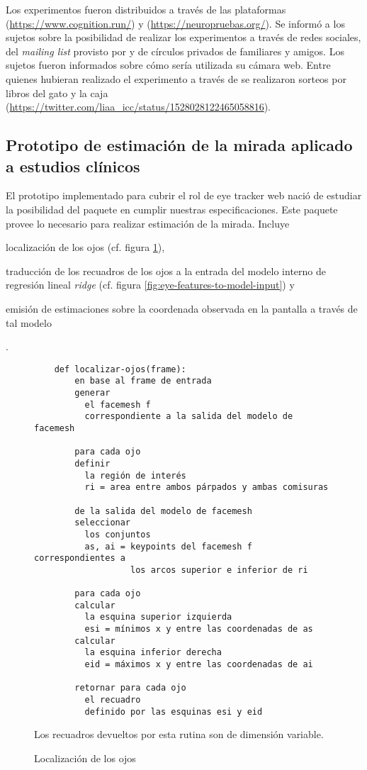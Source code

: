   Los experimentos fueron distribuidos a través de las plataformas \cognition
  (\url{https://www.cognition.run/}) y \neuropruebas
  (\url{https://neuropruebas.org/}).
  Se informó a los sujetos sobre la posibilidad de realizar los experimentos a
  través de redes sociales, del \textit{mailing list} provisto por \neuropruebas
  y de círculos privados de familiares y amigos.
  Los sujetos fueron informados sobre cómo sería utilizada su cámara web.
  Entre quienes hubieran realizado el experimento a través de \neuropruebas se 
  realizaron sorteos por libros del gato y la caja
  (\url{https://twitter.com/liaa_icc/status/1528028122465058816}).

\subsection{Prototipo de estimación de la mirada aplicado a estudios clínicos}

  El prototipo implementado para cubrir el rol de eye tracker web nació de
  estudiar la posibilidad del paquete \webgazer en cumplir nuestras
  especificaciones.
  Este paquete provee lo necesario para realizar estimación de la mirada.
  Incluye \begin{enumerate*}
    \item localización de los ojos (cf. figura \ref{fig:eyes-localization}),
    \item traducción de los recuadros de los ojos a la entrada del modelo interno
      de regresión lineal \textit{ridge} (cf. figura
      \ref{fig:eye-features-to-model-input}) y
    \item emisión de estimaciones sobre la coordenada observada en la pantalla a
      través de tal modelo
  \end{enumerate*}.

  \begin{figure}
    \centering
    \begin{verbatim}
    def localizar-ojos(frame):
        en base al frame de entrada
        generar
          el facemesh f
          correspondiente a la salida del modelo de facemesh

        para cada ojo
        definir
          la región de interés
          ri = area entre ambos párpados y ambas comisuras
        
        de la salida del modelo de facemesh
        seleccionar
          los conjuntos
          as, ai = keypoints del facemesh f correspondientes a
                   los arcos superior e inferior de ri
        
        para cada ojo
        calcular
          la esquina superior izquierda
          esi = mínimos x y entre las coordenadas de as
        calcular
          la esquina inferior derecha
          eid = máximos x y entre las coordenadas de ai
      
        retornar para cada ojo
          el recuadro
          definido por las esquinas esi y eid
    \end{verbatim}
    Los recuadros devueltos por esta rutina son de dimensión variable.
    \caption{Localización de los ojos}
    \label{fig:eyes-localization}
  \end{figure}

